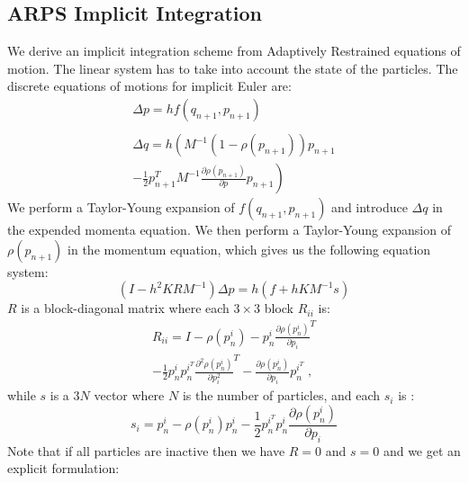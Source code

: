 \documentclass[11pt, oneside, a4paper]{memoir}
\begin{document}
\subsection{ ARPS Implicit Integration }
We derive an implicit integration scheme from Adaptively Restrained equations of motion.
The linear system has to take into account the state of the particles.
The discrete equations of motions for implicit Euler are:
\begin{equation}
	\label{eq:implicitEqMotion}
	\begin{array}{l}
	\displaystyle \Delta p =  h f(q_{n+1}, p_{n+1})\\
				\\
	\displaystyle \Delta q = h \left( M^{-1}(1-\rho(p_{n+1}))p_{n+1} \right. \\
	\displaystyle \left. - \frac{1}{2	}p_{n+1}^{T} M^{-1} \frac{\partial \rho(p_{n+1})}{\partial p}p_{n+1} \right)
	\end{array}
\end{equation}
We perform a Taylor-Young expansion of $f(q_{n+1}, p_{n+1})$ and introduce $\Delta q$ in the expended momenta equation.
We then perform a Taylor-Young expansion of $\rho(p_{n+1})$ in the momentum equation, which gives us the following equation system:
\begin{equation}
	\label{eq:arpsLinearSystem}
	( I -h^{2}KRM^{-1} ) \Delta p = h( f + h KM^{-1}s )
\end{equation}
$R$ is a block-diagonal matrix where each $3\times 3$ block $R_{ii}$ is:
\begin{equation}
	\label{eq:Ri}
	\begin{array}{l}
	\displaystyle R_{ii} = I - \rho(p^{i}_{n}) - p^{i}_{n} \frac{\partial \rho(p^{i}_{n})}{\partial p_{i}}^{T} \\
	\displaystyle - \frac{1}{2}p^{i}_{n}p^{i^{T}}_{n}\frac{\partial^{2} \rho(p^{i}_{n})}{\partial p_{i}^{2}}^{T} -
	\displaystyle \frac{\partial \rho(p^{i}_{n})}{\partial p_{i}} p^{i^{T}}_{n} \;,
	\end{array}
\end{equation}
while $s$ is a $3N$ vector where $N$ is the number of particles, and each $s_{i}$ is :
\begin{equation}
	\label{eq:si}
	\displaystyle s_{i} = p^{i}_{n} - \rho(p^{i}_{n})p^{i}_{n} - \frac{1}{2	}p^{i^{T}}_{n}p^{i}_{n}\frac{\partial \rho(p^{i}_{n})}{\partial p_{i}}
\end{equation}
Note that if all particles are inactive then we have $R = 0$ and $s = 0$ and we get an explicit formulation:
\end{document}

